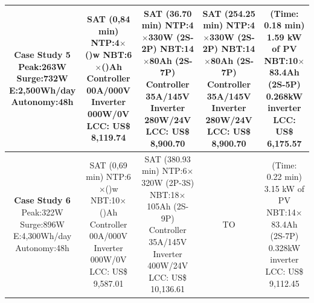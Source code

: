 \documentclass[10pt,journal,compsoc]{IEEEtran}
\begin{document}
\begin{table}
\begin{scriptsize}
\begin{tabular}{c|c|c|c|c}
\hline
\makecell{\textbf{Case Study 5}\\Peak:263W\\Surge:732W\\E:2,500Wh/day\\Autonomy:48h} & 
\makecell{SAT (0,84 min) \\NTP:4$\times$()w\\NBT:6$\times$()Ah\\Controller 00A/000V\\Inverter 000W/0V\\LCC: US\$ 8,119.74} &
\makecell {SAT (36.70 min) \\NTP:4$\times$330W (2S-2P)\\NBT:14$\times$80Ah (2S-7P)\\Controller 35A/145V\\Inverter 280W/24V \\LCC: US\$ 8,900.70}
& \makecell {SAT (254.25 min) \\NTP:4$\times$330W (2S-2P)\\NBT:14$\times$80Ah (2S-7P)\\Controller 35A/145V\\Inverter 280W/24V \\LCC: US\$ 8,900.70} 
& \makecell{(Time: 0.18 min)\\1.59 kW of PV\\NBT:10$\times$83.4Ah (2S-5P)\\0.268kW inverter\\LCC: US\$ 6,175.57} \\

\hline
\makecell{\textbf{Case Study 6}\\Peak:322W\\Surge:896W\\E:4,300Wh/day\\Autonomy:48h} & 
\makecell{SAT (0,69 min) \\NTP:6$\times$()w\\NBT:10$\times$()Ah\\Controller 00A/000V\\Inverter 000W/0V\\LCC: US\$ 9,587.01} &
\makecell {SAT (380.93 min) \\NTP:6$\times$320W (2P-3S)\\NBT:18$\times$105Ah (2S-9P)\\Controller 35A/145V\\Inverter 400W/24V \\LCC: US\$ 10,136.61} & TO & \makecell{(Time: 0.22 min)\\3.15 kW of PV\\NBT:14$\times$83.4Ah (2S-7P)\\0.328kW inverter\\LCC: US\$ 9,112.45} \\


\end{tabular}
\end{scriptsize}
\end{table}
\end{document}
